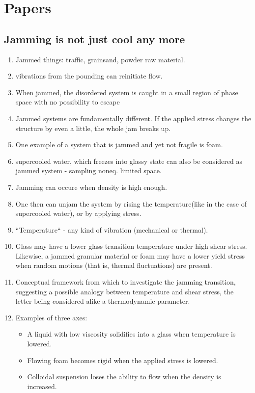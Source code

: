 \documentclass[10pt,a4paper]{article}
\begin{document}

\section{Papers}
\subsection{Jamming is not just cool any more\cite{nagel:98}}
\begin{enumerate}
 \item Jammed things: traffic, grainsand, powder raw material.
 \item vibrations from the pounding can reinitiate flow.
 \item When jammed, the disordered system is caught in a small region of phase space with no possibility to escape
 \item Jammed systems are fundamentally different. If the applied stress changes the structure by even a little, the whole jam breaks up. 
 \item One example of a system that is jammed and yet not fragile is foam.
 \item supercooled water, which freezes into glassy state can also be considered as jammed system - sampling noneq. limited space.
 \item Jamming can occure when density is high enough. 
 \item One then can unjam the system by rising the temperature(like in the case of supercooled water), or by applying stress. 
 \item ``Temperature`` - any kind of vibration (mechanical or thermal).
 \item Glass may have a lower glass transition temperature under high shear stress. 
 Likewise, a jammed granular material or foam may have a lower yield stress when random motions (that is, thermal fluctuations) are present.
 \item Conceptual framework from which to investigate the jamming transition, 
 suggesting a possible analogy between temperature and shear stress, the letter being considered alike a thermodynamic parameter.
 \item Examples of three axes:
 \begin{itemize}
  \item A liquid with low viscosity solidifies into a glass when temperature is lowered.
  \item Flowing foam becomes rigid when the applied stress is lowered.
  \item Colloidal suspension loses the ability to flow when the density is increased. 
 \end{itemize}

\end{enumerate}
\end{document}
